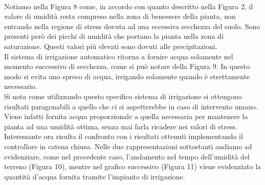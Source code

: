 \documentclass[conference,10pt]{IEEEtran}
\begin{document}
\\
Notiamo nella Figura 8 come, in accordo con quanto descritto nella Figura 2, il valore di umidità resta compreso nella zona di benessere della pianta, non entrando nella regione di stress dovuta ad una eccessiva secchezza del suolo. Sono presenti però dei picchi di umidità che portano la pianta nella zona di saturazione. Questi valori più elevati sono dovuti alle precipitazioni.\\ Il sistema di irrigazione automatico ritorna a fornire acqua solamente nel momento successivo di secchezza, come si può notare della Figura 9. In questo modo si evita uno spreco di acqua, irrigando solamente quando è strettamente necessario.\\
Si nota come utilizzando questo specifico sistema di irrigazione si ottengono risultati paragonabili a quello che ci si aspetterebbe in caso di intervento umano. Viene infatti fornita acqua proporzionale a quella necessaria per mantenere la pianta ad una umidità ottima, senza mai farla ricadere nei valori di stress.\\
Interessante ora risulta il confronto con i risultati ottenuti implementando il controllore in catena chiusa.
Nelle due rappresentazioni sottostanti andiamo ad evidenziare, come nel precedente caso, l'andamento nel tempo dell'umidità del terreno (Figura 10), mentre nel grafico successivo (Figura 11) viene evidenziato la quantità d'acqua fornita tramite l'impianto di irrigazione.








\end{document}
